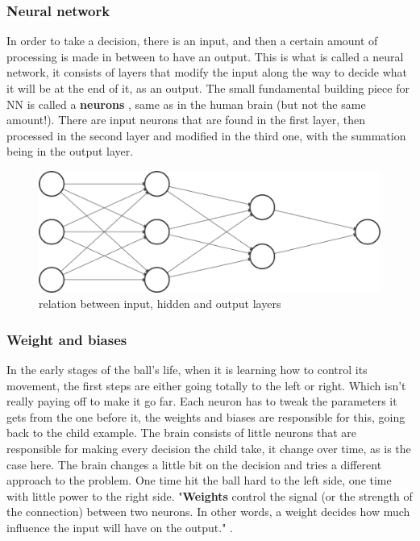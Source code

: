 \subsubsection{Neural network}
In order to take a decision, there is an input, and then a certain amount of processing is made in between to have an output. This is what is called a neural network, it consists of layers that modify the input along the way to decide what it will be at the end of it, as an output. The small fundamental building piece for NN is called a \textbf{neurons} , same as in the human brain (but not the same amount!). There are input neurons that are found in the first layer, then processed in the second layer and modified in the third one, with the summation being in the output layer.

\begin{figure}
	\centering
	\includegraphics[width=0.7\linewidth]{usedImages/nn}
	\caption{relation between input, hidden and output layers}
	\label{fig:nn}
\end{figure}

\subsubsection{Weight and biases}

In the early stages of the ball's life, when it is learning how to control its movement, the first steps are either going totally to the left or right. Which isn't really paying off to make it go far. Each neuron has to tweak the parameters it gets from the one before it, the weights and biases are responsible for this, going back to the child example. The brain consists of little neurons that are responsible for making every decision the child take, it change over time, as is the case here. The brain changes a little bit on the decision and tries a different approach to the problem. One time hit the ball hard to the left side, one time with little power to the right side. "\textbf{Weights} control the signal (or the strength of the connection) between two neurons. In other words, a weight decides how much influence the input will have on the output." .

